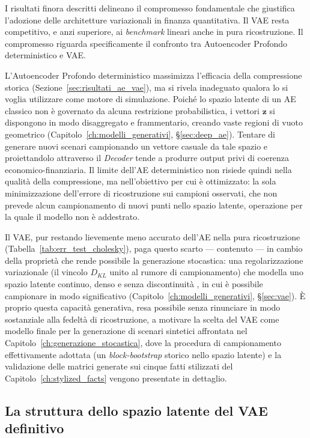 I risultati finora descritti delineano il compromesso fondamentale che giustifica l'adozione delle architetture variazionali in finanza quantitativa. Il VAE resta competitivo, e anzi superiore, ai \emph{benchmark} lineari anche in pura ricostruzione. Il compromesso riguarda specificamente il confronto tra Autoencoder Profondo deterministico e VAE.

L'Autoencoder Profondo deterministico massimizza l'efficacia della compressione storica (Sezione~\ref{sec:risultati_ae_vae}), ma si rivela inadeguato qualora lo si voglia utilizzare come motore di simulazione. Poiché lo spazio latente di un AE classico non è governato da alcuna restrizione probabilistica, i vettori $\mathbf{z}$ si dispongono in modo disaggregato e frammentario, creando vaste regioni di vuoto geometrico (Capitolo~\ref{ch:modelli_generativi}, \S\ref{sec:deep_ae}). Tentare di generare nuovi scenari campionando un vettore casuale da tale spazio e proiettandolo attraverso il \emph{Decoder} tende a produrre output privi di coerenza economico-finanziaria. Il limite dell'AE deterministico non risiede quindi nella qualità della compressione, ma nell'obiettivo per cui è ottimizzato: la sola minimizzazione dell'errore di ricostruzione sui campioni osservati, che non prevede alcun campionamento di nuovi punti nello spazio latente, operazione per la quale il modello non è addestrato.

Il VAE, pur restando lievemente meno accurato dell'AE nella pura ricostruzione (Tabella~\ref{tab:err_test_cholesky}), paga questo scarto --- contenuto --- in cambio della proprietà che rende possibile la generazione stocastica: una regolarizzazione variazionale (il vincolo $D_{KL}$ unito al rumore di campionamento) che modella uno spazio latente continuo, denso e senza discontinuità \citep{burgess2018understanding}, in cui è possibile campionare in modo significativo (Capitolo~\ref{ch:modelli_generativi}, \S\ref{sec:vae}). È proprio questa capacità generativa, resa possibile senza rinunciare in modo sostanziale alla fedeltà di ricostruzione, a motivare la scelta del VAE come modello finale per la generazione di scenari sintetici affrontata nel Capitolo~\ref{ch:generazione_stocastica}, dove la procedura di campionamento effettivamente adottata (un \emph{block-bootstrap} storico nello spazio latente) e la validazione delle matrici generate sui cinque fatti stilizzati del Capitolo~\ref{ch:stylized_facts} vengono presentate in dettaglio.

\subsection{La struttura dello spazio latente del VAE definitivo}
\label{subsec:struttura_latente}

